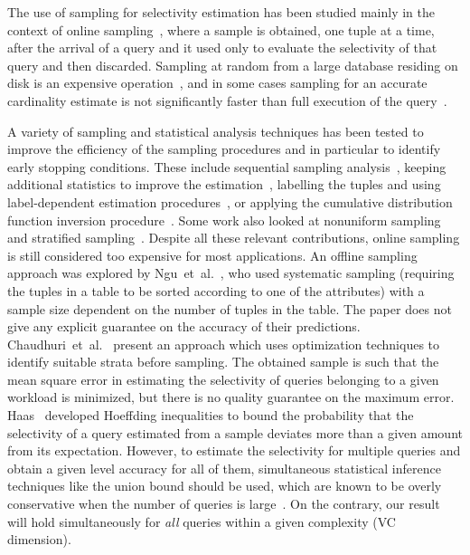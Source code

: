 The use of sampling for selectivity estimation has been studied mainly in the
context of online sampling~\citep{LiptonNS90,LiptonN95}, where a sample is
obtained, one tuple at a time, after the arrival of a query and it used only
to evaluate the selectivity of that query and then discarded. Sampling at random
from a large database residing
on disk is an expensive operation~\citep{Olken93,BrownH06,GemullaLH06}, and in
some cases sampling for an accurate cardinality estimate is not significantly
faster than full execution of the query~\citep{HaasNSS93,HaasNS94}.

A variety of sampling and statistical analysis techniques has been tested to 
improve the efficiency of the sampling procedures and in particular
to identify early stopping conditions. These include sequential sampling
analysis~\citep{HouOD91,HaasS92}, keeping additional statistics to improve the
estimation~\citep{HaasS95}, labelling the tuples and using label-dependent
estimation procedures~\citep{GangulyGMS96}, or applying the cumulative distribution
function inversion procedure~\citep{WuAE01}. Some work also looked at nonuniform
sampling~\citep{BabcockCD03,EstanN06} and stratified
sampling~\citep{ChaudhuriDN07,JoshiJ08}. Despite all these relevant
contributions, online sampling is still considered too expensive for most
applications. An offline sampling approach was explored by
Ngu~et~al.~\citeyearpar{NguHS04}, who used systematic sampling (requiring the tuples in
a
table to be sorted according to one of the attributes) with a
sample size dependent on the number of tuples in the table. The paper does
not give any explicit guarantee on the accuracy of their predictions.
Chaudhuri~et~al.~\citeyearpar{ChaudhuriDN07} present an approach which uses
optimization techniques to identify suitable strata before sampling. The
obtained sample is such that the mean square error in estimating the selectivity
of queries belonging to a given workload is minimized, but there is no quality
guarantee on the maximum error. Haas~\citeyearpar{Haas96} developed Hoeffding
inequalities to bound the probability that the selectivity of a query estimated
from a sample deviates more than a given amount from its expectation.
However, to estimate the selectivity for multiple queries and obtain a given
level accuracy for all of them, simultaneous statistical inference techniques
like the union bound should be used, which are known to be overly conservative
when the number of queries is large~\citep{Miller81}. On the contrary, our result
will hold simultaneously for \emph{all} queries within a given complexity (VC
dimension). 

